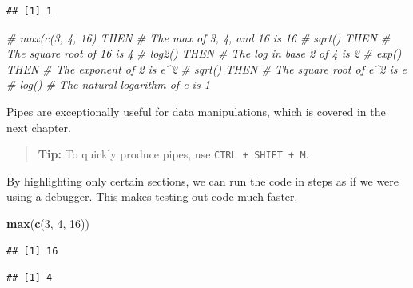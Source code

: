 \documentclass[openany]{book}
\newenvironment{Shaded}{\begin{snugshade}}{\end{snugshade}}
\newcommand{\CommentTok}[1]{\textcolor[rgb]{0.56,0.35,0.01}{\textit{#1}}}
\newcommand{\DecValTok}[1]{\textcolor[rgb]{0.00,0.00,0.81}{#1}}
\newcommand{\KeywordTok}[1]{\textcolor[rgb]{0.13,0.29,0.53}{\textbf{#1}}}
\newcommand{\NormalTok}[1]{#1}
\newcommand{\OperatorTok}[1]{\textcolor[rgb]{0.81,0.36,0.00}{\textbf{#1}}}
\newcommand{\StringTok}[1]{\textcolor[rgb]{0.31,0.60,0.02}{#1}}
\begin{document}
\begin{verbatim}
## [1] 1
\end{verbatim}

\begin{Shaded}
\begin{Highlighting}[]
\CommentTok{# max(c(3, 4, 16) THEN  # The max of 3, 4, and 16 is 16}
\CommentTok{#  sqrt() THEN          # The square root of 16 is 4}
\CommentTok{#  log2() THEN          # The log in base 2 of 4 is 2}
\CommentTok{#  exp() THEN           # The exponent of 2 is e^2}
\CommentTok{#  sqrt() THEN          # The square root of e^2 is e}
\CommentTok{#  log()                # The natural logarithm of e is 1}
\end{Highlighting}
\end{Shaded}

Pipes are exceptionally useful for data manipulations, which is covered in the
next chapter.

\begin{quote}
\textbf{Tip:} To quickly produce pipes, use \texttt{CTRL\ +\ SHIFT\ +\ M}.
\end{quote}

By highlighting only certain sections, we can run the code in steps as if we were
using a debugger. This makes testing out code much faster.

\begin{Shaded}
\begin{Highlighting}[]
\KeywordTok{max}\NormalTok{(}\KeywordTok{c}\NormalTok{(}\DecValTok{3}\NormalTok{, }\DecValTok{4}\NormalTok{, }\DecValTok{16}\NormalTok{))}
\end{Highlighting}
\end{Shaded}

\begin{verbatim}
## [1] 16
\end{verbatim}

\begin{Shaded}
\end{Shaded}

\begin{verbatim}
## [1] 4
\end{verbatim}

\begin{Shaded}
\end{Shaded}
\end{document}
